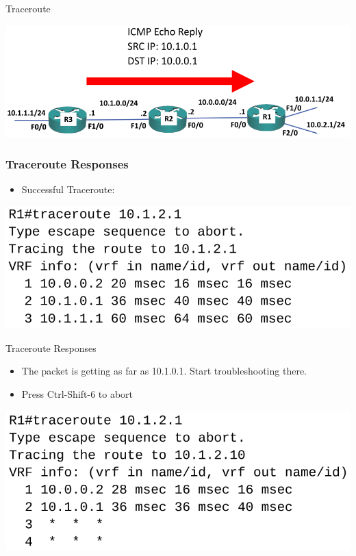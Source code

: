 \documentclass[pdflatex,compress,mathserif]{beamer}
\begin{document}
\begin{frame}{Traceroute}
	\begin{center}
		\includegraphics[width=\linewidth]{img/img09}
	\end{center}
\end{frame}

\begin{frame}
	\frametitle{Traceroute Responses}
	\begin{itemize}
		\item Successful Traceroute:
	\end{itemize}
	\begin{center}
		\includegraphics[width=\linewidth]{img/img10}
	\end{center}
\end{frame}

\begin{frame}{Traceroute Responses}
	\begin{itemize}
		\item The packet is getting as far as 10.1.0.1. Start troubleshooting there.
		\item Press Ctrl-Shift-6 to abort
	\end{itemize}
	\begin{center}
		\includegraphics[width=\linewidth]{img/img11}
	\end{center}
\end{frame}
\end{document}
